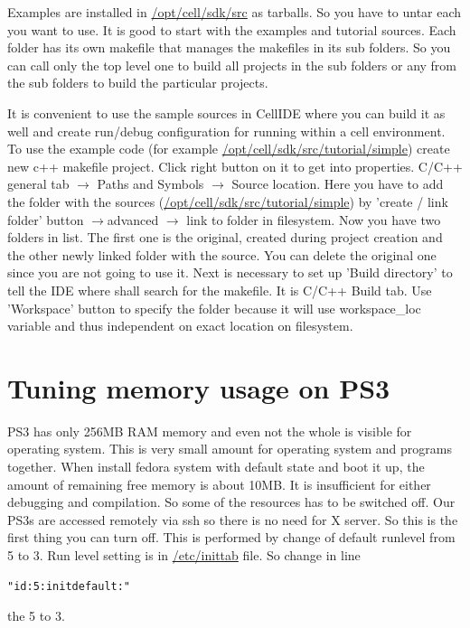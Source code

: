 Examples are installed in \url{/opt/cell/sdk/src} as tarballs.
So you have to untar each you want to use.
It is good to start with the examples and tutorial sources.
Each folder has its own makefile that manages the makefiles in its sub folders.
So you can call only the top level one to build all projects in the sub folders or any from the sub folders to build the particular projects.

It is convenient to use the sample sources in CellIDE where you can build it as well and create run/debug configuration for running within a cell environment.
To use the example code (for example \url{/opt/cell/sdk/src/tutorial/simple}) create new c++ makefile project.
Click right button on it to get into properties.
C/C++ general tab $\rightarrow$ Paths and Symbols $\rightarrow$ Source location.
Here you have to add the folder with the sources (\url{/opt/cell/sdk/src/tutorial/simple}) by 'create / link folder' button $\rightarrow$advanced $\rightarrow$ link to folder in filesystem.
Now you have two folders in list. The first one is the original, created during project creation and the other newly linked folder with the source.
You can delete the original one since you are not going to use it.
Next is necessary to set up 'Build directory' to tell the IDE where shall search for the makefile.
It is C/C++ Build tab. Use 'Workspace' button to specify the folder because it will use workspace\_loc variable and thus independent on exact location on filesystem.

\section{Tuning memory usage on PS3}
\label{ps3MemoryUsage}

PS3 has only 256MB RAM memory and even not the whole is visible for operating system.
This is very small amount for operating system and programs together.
When install fedora system with default state and boot it up, the amount of remaining free memory is about 10MB.
It is insufficient for either debugging and compilation.
So some of the resources has to be switched off.
Our PS3s are accessed remotely via ssh so there is no need for X server.
So this is the first thing you can turn off.
This is performed by change of default runlevel from 5 to 3.
Run level setting is in \url{/etc/inittab} file. So change in line
\begin{verbatim}
"id:5:initdefault:"
\end{verbatim}
the 5 to 3.

